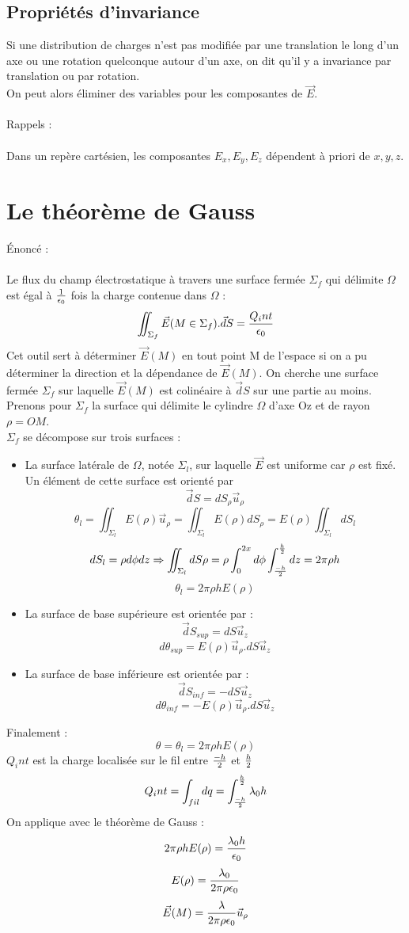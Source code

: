 \documentclass[11pt,a4paper,french]{article}
\begin{document}
\subsection{Propriétés d'invariance}
Si une distribution de charges n'est pas modifiée par une translation le long d'un axe ou une rotation quelconque autour d'un axe, on dit qu'il y a invariance par translation ou par rotation. \\
On peut alors éliminer des variables pour les composantes de $\vec E$. \\ \\
Rappels : \\ \\
Dans un repère cartésien, les composantes $E_x, E_y, E_z$ dépendent à priori de $x, y, z$.
\newpage
\section{Le théorème de Gauss}
Énoncé : \\ \\
Le flux du champ électrostatique à travers une surface fermée $\Sigma_f$ qui délimite $\Omega$ est égal à $1 \over \epsilon_0$ fois la charge contenue dans $\Omega$ : 
$$\iint_{\Sigma_f} \vec E(M \in \Sigma_f) .\vec dS = {Q_int \over \epsilon_0}$$
Cet outil sert à déterminer $\vec E(M)$ en tout point M de l'espace si on a pu déterminer la direction et la dépendance de $\vec E(M)$. On cherche une surface fermée $\Sigma_f$ sur laquelle $\vec E(M)$ est colinéaire à $\vec dS$ sur une partie au moins. \\
Prenons pour $\Sigma_f$ la surface qui délimite le cylindre $\Omega$ d'axe Oz et de rayon $\rho = OM$. \\
$\Sigma_f$ se décompose sur trois surfaces : 
\begin{itemize}
\item La surface latérale de $\Omega$, notée $\Sigma_l$, sur laquelle $\vec E$ est uniforme car $\rho$ est fixé. \\
Un élément de cette surface est orienté par 
$$\vec dS = dS_\rho \vec u_\rho$$
$$\theta_{l} = \iint_{\Sigma_l} E(\rho) \vec u_\rho=\iint_{\Sigma_l} E(\rho)dS_\rho=E(\rho)\iint_{\Sigma_l} dS_l$$
$$dS_l = \rho d\phi dz \Rightarrow\iint_{\Sigma_l}dS\rho=\rho\int_0^{2x}d\phi\int_{-h \over 2}^{h\over 2}dz = 2\pi\rho h $$
$$\theta_l=2\pi\rho h E(\rho)$$
\item La surface de base supérieure est orientée par : 
$$\vec dS_{sup} = dS\vec u_z$$
$$d\theta_{sup} = E(\rho) \vec u_\rho . dS \vec u_z$$
\item La surface de base inférieure est orientée par : 
$$\vec dS_{inf} = -dS\vec u_z$$
$$d\theta_{inf} = -E(\rho) \vec u_\rho . dS \vec u_z$$
\end{itemize}
\newpage
Finalement : 
$$\theta = \theta_l = 2 \pi \rho h E(\rho)$$
$Q_int$ est la charge localisée sur le fil entre $-h \over 2$ et $h \over 2$
$$Q_int = \int_{fil} dq = \int_{-h \over 2}^{h \over 2} \lambda_0 h$$
On applique avec le théorème de Gauss : 
$$2 \pi \rho h E(\rho) = {\lambda_0 h \over \epsilon_0}$$
$$E(\rho) = {\lambda_0 \over 2\pi\rho\epsilon_0}$$
$$\vec E(M) = {\lambda \over 2\pi\rho\epsilon_0} \vec u_\rho$$
\end{document}
